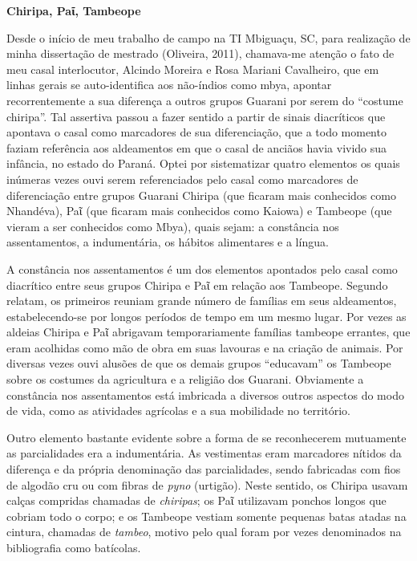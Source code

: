\textbf{Chiripa, Paῖ, Tambeope}

Desde o início de meu trabalho de campo na TI Mbiguaçu, SC, para
realização de minha dissertação de mestrado (Oliveira, 2011), chamava-me
atenção o fato de meu casal interlocutor, Alcindo Moreira e Rosa Mariani
Cavalheiro, que em linhas gerais se auto-identifica aos não-índios como
mbya, apontar recorrentemente a sua diferença a outros grupos Guarani
por serem do ``costume chiripa''. Tal assertiva passou a fazer sentido a
partir de sinais diacríticos que apontava o casal como marcadores de sua
diferenciação, que a todo momento faziam referência aos aldeamentos em
que o casal de anciãos havia vivido sua infância, no estado do Paraná.
Optei por sistematizar quatro elementos os quais inúmeras vezes ouvi
serem referenciados pelo casal como marcadores de diferenciação entre
grupos Guarani Chiripa (que ficaram mais conhecidos como Nhandéva), Paῖ
(que ficaram mais conhecidos como Kaiowa) e Tambeope (que vieram a ser
conhecidos como Mbya), quais sejam: a constância nos assentamentos, a
indumentária, os hábitos alimentares e a língua.

A constância nos assentamentos é um dos elementos apontados pelo casal
como diacrítico entre seus grupos Chiripa e Paῖ em relação aos Tambeope.
Segundo relatam, os primeiros reuniam grande número de famílias em seus
aldeamentos, estabelecendo-se por longos períodos de tempo em um mesmo
lugar. Por vezes as aldeias Chiripa e Paῖ abrigavam temporariamente
famílias tambeope errantes, que eram acolhidas como mão de obra em suas
lavouras e na criação de animais. Por diversas vezes ouvi alusões de que
os demais grupos ``educavam'' os Tambeope sobre os costumes da
agricultura e a religião dos Guarani. Obviamente a constância nos
assentamentos está imbricada a diversos outros aspectos do modo de vida,
como as atividades agrícolas e a sua mobilidade no território.

Outro elemento bastante evidente sobre a forma de se reconhecerem
mutuamente as parcialidades era a indumentária. As vestimentas eram
marcadores nítidos da diferença e da própria denominação das
parcialidades, sendo fabricadas com fios de algodão cru ou com fibras de
\emph{pyno} (urtigão). Neste sentido, os Chiripa usavam calças compridas
chamadas de \emph{chiripas}; os Paῖ utilizavam ponchos longos que
cobriam todo o corpo; e os Tambeope vestiam somente pequenas batas
atadas na cintura, chamadas de \emph{tambeo}, motivo pelo qual foram por
vezes denominados na bibliografia como batícolas.

